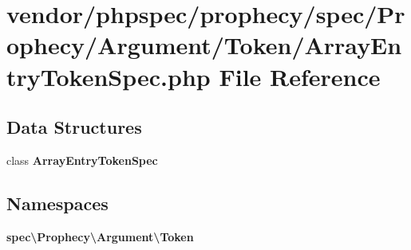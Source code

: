 \section{vendor/phpspec/prophecy/spec/\+Prophecy/\+Argument/\+Token/\+Array\+Entry\+Token\+Spec.php File Reference}
\label{_array_entry_token_spec_8php}
\subsection*{Data Structures}
\begin{DoxyCompactItemize}
\item 
class {\bf Array\+Entry\+Token\+Spec}
\end{DoxyCompactItemize}
\subsection*{Namespaces}
\begin{DoxyCompactItemize}
\item 
 {\bf spec\textbackslash{}\+Prophecy\textbackslash{}\+Argument\textbackslash{}\+Token}
\end{DoxyCompactItemize}
